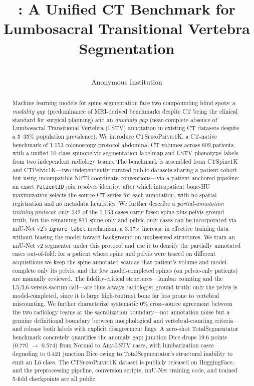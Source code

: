 \documentclass[pmlr]{jmlr}
\title[\dataset{}]{\dataset{}: A Unified CT Benchmark for Lumbosacral Transitional Vertebra Segmentation}
\author{%
  \Name{Anonymous Author(s)}
  \Email{anonymous@institution.edu}\\
  \addr Anonymous Institution
}
\newcommand{\dataset}{\textsc{CTSpinoPelvic1K}}
\begin{document}
\maketitle

\begin{abstract}
Machine learning models for spine segmentation face two compounding
blind spots: a \emph{modality gap} (predominance of MRI-derived
benchmarks despite CT being the clinical standard for surgical
planning) and an \emph{anomaly gap} (near-complete absence of
Lumbosacral Transitional Vertebra (LSTV) annotation in existing CT
datasets despite a 5--35\% population prevalence).
We introduce \dataset{}, a CT-native benchmark of 1{,}153
colonoscopy-protocol abdominal CT volumes across 802 patients
with a unified 10-class spinopelvic segmentation labelmap and
LSTV phenotype labels from two independent radiology teams.
The benchmark is assembled from CTSpine1K and CTPelvic1K---two
independently curated public datasets sharing a patient cohort but
using incompatible NIfTI coordinate conventions---via a
patient-anchored pipeline: an exact \texttt{PatientID} join
resolves identity, after which intrapatient bone-HU maximization
selects the source CT series for each annotation, with no spatial
registration and no metadata heuristics.
We further describe a \emph{partial-annotation training protocol}:
only 342 of the 1{,}153 cases carry fused spine-plus-pelvis ground
truth, but the remaining 811 spine-only and pelvic-only cases can
be incorporated via nnU-Net v2's \texttt{ignore\_label} mechanism,
a 3.37$\times$ increase in effective training data without biasing
the model toward background on unobserved structures.
We train an nnU-Net v2 segmenter under this protocol and use it to
densify the partially annotated cases out-of-fold: for a patient
whose spine and pelvis were traced on different acquisitions we keep
the spine-annotated scan as that patient's volume and model-complete
only its pelvis, and the few model-completed spines (on pelvic-only
patients) are manually reviewed.
The fidelity-critical structures---lumbar counting and the
L5/L6-versus-sacrum call---are thus always radiologist ground truth;
only the pelvis is model-completed, since it is large high-contrast
bone far less prone to vertebral miscounting.
We further characterize systematic 0\% cross-source agreement
between the two radiology teams at the sacralization boundary---not
annotation noise but a genuine definitional boundary between
morphological and vertebral-counting criteria---and release both
labels with explicit disagreement flags.
A zero-shot TotalSegmentator benchmark concretely quantifies the
anomaly gap: junction Dice drops 19.6 points (0.770 $\rightarrow$
0.574) from Normal to Any-LSTV cases, with lumbarization cases
degrading to 0.421 junction Dice owing to TotalSegmentator's
structural inability to emit an L6 class.
The \dataset{} dataset is publicly released on HuggingFace, and the
preprocessing pipeline, conversion scripts, nnU-Net training code,
and trained 5-fold checkpoints are all public.
\end{abstract}
\end{document}
